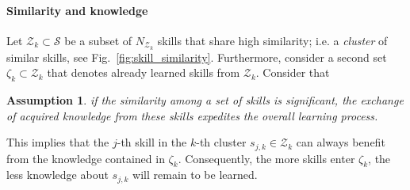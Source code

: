\documentclass[12pt]{article}
\renewcommand{\emph}[1]{\textit{#1}}
\newtheorem{assumption}{Assumption}
\begin{document}
\paragraph*{Similarity and knowledge}
Let $\mathcal{Z}_k \subset \mathcal{S}$ be a subset of $N_{\mathcal{Z}_k}$ skills that share high similarity; i.e. a \emph{cluster} of similar skills, see Fig.~\ref{fig:skill_similarity}. Furthermore, consider a second set $\mathcal{\zeta}_k \subset \mathcal{Z}_k$ that denotes already learned skills from $\mathcal{Z}_k$. Consider that
\begin{tcolorbox}
	\begin{assumption}\label{assumption:skill_clustering} if the similarity among a set of skills is significant, the exchange of acquired knowledge from these skills expedites the overall learning process.
	\end{assumption}
\end{tcolorbox}
\noindent This implies that the $j$-th skill in the $k$-th cluster $s_{j,k} \in \mathcal{Z}_k$ can always benefit from the knowledge contained in $\mathcal{\zeta}_k$. Consequently, the more skills enter $\mathcal{\zeta}_k$, the less knowledge about $ s_{j,k} $ will remain to be learned.
\end{document}
